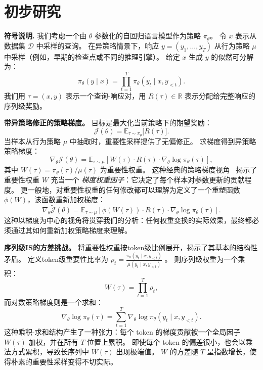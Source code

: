 \documentclass{article}
\theoremstyle{plain}
\theoremstyle{definition}
\theoremstyle{remark}
\begin{document}
\section{初步研究}
\label{sec:prelim}

\textbf{符号说明.}
我们考虑一个由 $\theta$ 参数化的自回归语言模型作为策略 $\pi_\theta$。
令 $x$ 表示从数据集 $\mathcal{D}$ 中采样的查询。
在异策略情景下，响应 $y = (y_1, \ldots, y_T)$ 从行为策略 $\mu$ 中采样（例如，早期的检查点或不同的推理引擎）。
给定 $x$ 生成 $y$ 的似然可分解为：
\begin{equation}
  \label{eq:autoregressive}
  \pi_\theta(y \mid x) = \prod_{t=1}^{T} \pi_\theta(y_t \mid x, y_{<t}).
\end{equation}
我们用 $\tau = (x, y)$ 表示一个查询-响应对，用 $R(\tau) \in \mathbb{R}$ 表示分配给完整响应的序列级奖励。

\textbf{带异策略修正的策略梯度。}
目标是最大化当前策略下的期望奖励：
\begin{equation}
  \label{eq:objective}
  \mathcal{J}(\theta) = \mathbb{E}_{\tau \sim \pi_\theta}\bigl[R(\tau)\bigr].
\end{equation}
当样本从行为策略 $\mu$ 中抽取时，重要性采样提供了无偏修正。  
求梯度得到异策略策略梯度：
\begin{equation}
  \label{eq:off-policy-pg}
  \nabla_\theta \mathcal{J}(\theta) = \mathbb{E}_{\tau \sim \mu}\left[W(\tau) \cdot R(\tau) \cdot \nabla_\theta \log \pi_\theta(\tau)\right],
\end{equation}
其中 $W(\tau) = \pi_\theta(\tau) / \mu(\tau)$ 为重要性权重。  
这种经典的策略梯度视角~\cite{sutton1999policy} 揭示了重要性权重 $W$ 充当一个 \emph{梯度权重因子}：它决定了每个样本对参数更新的贡献程度。  
更一般地，对重要性权重的任何修改都可以理解为定义了一个重塑函数 $\phi(W)$，该函数重新加权梯度：
\begin{equation}
  \label{eq:reshaped-pg}
  \nabla_\theta \tilde{\mathcal{J}}(\theta) = \mathbb{E}_{\tau \sim \mu}\left[\phi(W(\tau)) \cdot R(\tau) \cdot \nabla_\theta \log \pi_\theta(\tau)\right].
\end{equation}
这种以梯度为中心的视角将贯穿我们的分析：任何权重变换的实际效果，最终都必须通过其如何重新加权策略梯度来理解。

\textbf{序列级IS的方差挑战。}
将重要性权重按token级比例展开，揭示了其基本的结构性矛盾。
定义token级重要性比率为 $\rho_t = \frac{\pi_\theta(y_t \mid x, y_{<t})}{\mu(y_t \mid x, y_{<t})}$ 。
则序列级权重为一个乘积：
\begin{equation}
  \label{eq:seq-weight}
  W(\tau) = \prod_{t=1}^{T} \rho_t,
\end{equation}
而对数策略梯度则是一个求和：
\begin{equation}
  \label{eq:log-grad-sum}
  \nabla_\theta \log \pi_\theta(\tau) = \sum_{t=1}^{T} \nabla_\theta \log \pi_\theta(y_t \mid x, y_{<t}).
\end{equation}
这种乘积-求和结构产生了一种张力：每个 token 的梯度贡献被一个全局因子 $W(\tau)$ 加权，并在所有 $T$ 位置上累积。  
即使每个 token 的偏差很小，也会以乘法方式累积，导致长序列中 $W(\tau)$ 出现极端值。  
$W$ 的方差随 $T$ 呈指数增长，使得朴素的重要性采样变得不切实际。
\end{document}
